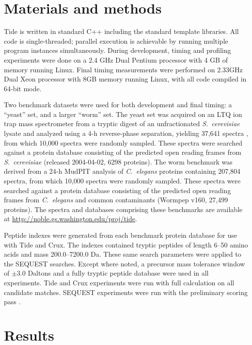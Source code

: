 \section{Materials and methods \label{section:methods}}

Tide is written in standard C++ including the standard template
libraries. All code is single-threaded; parallel execution is
achievable by running multiple program instances simultaneously.
During development, timing and profiling experiments were done on a
2.4 GHz Dual Pentium processor with 4 GB of memory running
Linux. Final timing measurements were performed on 2.33GHz Dual Xeon
processor with 8GB memory running Linux, with all code compiled in
64-bit mode.

Two benchmark datasets were used for both development and final
timing: a ``yeast'' set, and a larger ``worm'' set. The yeast set was
acquired on an LTQ ion trap mass spectrometer from a tryptic digest of
an unfractionated {\it S.\ cerevisiae} lysate and analyzed using a 4-h
reverse-phase separation, yielding 37,641 spectra
\cite{kall:semi-supervised}, from which 10,000 spectra were randomly
sampled. These spectra were searched against a protein database
consisting of the predicted open reading frames from {\it
  S.\ cerevisiae} (released 2004-04-02, 6298 proteins). The worm
benchmark was derived from a 24-h MudPIT analysis of {\it C.\ elegans}
proteins containing 207,804 spectra, from which 10,000 spectra were
randomly sampled.  These spectra were searched against a protein
database consisting of the predicted open reading frames from {\it
  C.\ elegans} and common contaminants (Wormpep v160, 27,499
proteins).  The spectra and databases comprising these benchmarks are
available at \url{http://noble.gs.washington.edu/proj/tide}.

Peptide indexes were generated from each benchmark protein database
for use with Tide and Crux. The indexes contained tryptic peptides of
length 6--50 amino acids and mass 200.0--7200.0 Da. These same search
parameters were applied to the SEQUEST searches. Except where noted, a
precursor mass tolerance window of $\pm3.0$ Daltons and a fully
tryptic peptide database were used in all experiments. Tide and Crux
experiments were run with full \XCorr calculation on all candidate
matches. SEQUEST experiments were run with the preliminary scoring
pass \Sp.


\section{Results}

